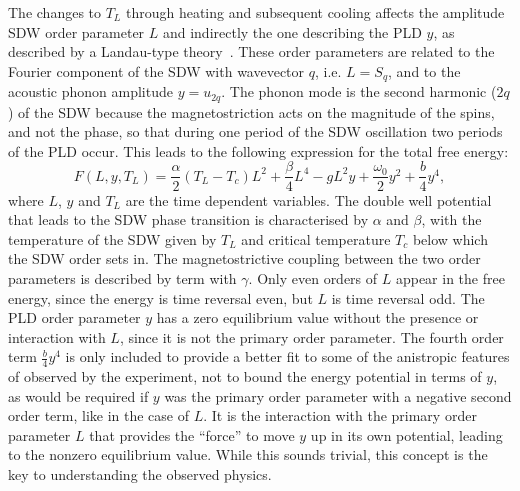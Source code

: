 The changes to $T_L$ through heating and subsequent cooling affects the amplitude SDW order parameter $L$ and indirectly the one describing the PLD $y$, as described by a Landau-type theory~\cite{Khomskii2010}.
These order parameters are related to the Fourier component of the SDW with wavevector $q$, i.e. $L = S_q$, and to the acoustic phonon amplitude $y = u_{2q}$.
The phonon mode is the second harmonic ($2q$) of the SDW because the magnetostriction acts on the magnitude of the spins, and not the phase, so that during one period of the SDW oscillation two periods of the PLD occur.
This leads to the following expression for the total free energy:
\begin{equation}
	\label{eq:Cr_landau}
	F(L, y, T_L) = \frac{\alpha}{2}(T_L - T_c) L^2 + \frac{\beta}{4} L^4 - g L^2 y + \frac{\omega_0}{2} y^2 + \frac{b}{4} y^4,
\end{equation}
where $L$, $y$ and $T_L$ are the time dependent variables.
The double well potential that leads to the SDW phase transition is characterised by $\alpha$ and $\beta$, with the temperature of the SDW given by $T_L$ and critical temperature $T_c$ below which the SDW order sets in.
The magnetostrictive coupling between the two order parameters is described by term with $\gamma$.
Only even orders of $L$ appear in the free energy, since the energy is time reversal even, but $L$ is time reversal odd.
The PLD order parameter $y$ has a zero equilibrium value without the presence or interaction with $L$, since it is not the primary order parameter.
The fourth order term $\frac{b}{4}y^4$ is only included to provide a better fit to some of the anistropic features of observed by the experiment, not to bound the energy potential in terms of $y$, as would be required if $y$ was the primary order parameter with a negative second order term, like in the case of $L$.
It is the interaction with the primary order parameter $L$ that provides the ``force'' to move $y$ up in its own potential, leading to the nonzero equilibrium value.
While this sounds trivial, this concept is the key to understanding the observed physics.

